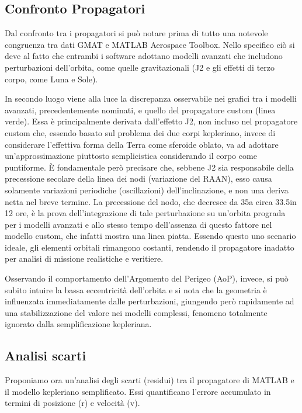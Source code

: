 \documentclass[12pt, a4paper]{article}
\begin{document}
\subsection{Confronto Propagatori}
Dal confronto tra i propagatori si può notare prima di tutto una notevole congruenza tra dati GMAT e MATLAB Aerospace Toolbox. Nello specifico ciò si deve al fatto che entrambi i software adottano modelli avanzati che includono perturbazioni dell'orbita, come quelle gravitazionali (J2 e gli effetti di terzo corpo, come Luna e Sole).

In secondo luogo viene alla luce la discrepanza osservabile nei grafici tra i modelli avanzati, precedentemente nominati, e quello del propagatore custom (linea verde). Essa è principalmente derivata dall'effetto J2, non incluso nel propagatore custom che, essendo basato sul problema dei due corpi kepleriano, invece di considerare l'effettiva forma della Terra come sferoide oblato, va ad adottare un'approssimazione piuttosto semplicistica considerando il corpo come puntiforme. È fondamentale però precisare che, sebbene J2 sia responsabile della precessione secolare della linea dei nodi (variazione del RAAN), esso causa solamente variazioni periodiche (oscillazioni) dell'inclinazione, e non una deriva netta nel breve termine. La precessione del nodo, che decresce da 35\degree a circa 33.5\degree in 12 ore, è la prova dell'integrazione di tale perturbazione su un'orbita prograda per i modelli avanzati e allo stesso tempo dell'assenza di questo fattore nel modello custom, che infatti mostra una linea piatta. Essendo questo uno scenario ideale, gli elementi orbitali rimangono costanti, rendendo il propagatore inadatto per analisi di missione realistiche e veritiere.

Osservando il comportamento dell'Argomento del Perigeo (AoP), invece, si può subito intuire la bassa eccentricità dell’orbita e si nota che la geometria è influenzata immediatamente dalle perturbazioni, giungendo però rapidamente ad una stabilizzazione del valore nei modelli complessi, fenomeno totalmente ignorato dalla semplificazione kepleriana.

\subsection{Analisi scarti}
\label{sec:analisiScarti}
Proponiamo ora un'analisi degli scarti (residui) tra il propagatore di MATLAB e il modello kepleriano semplificato. Essi quantificano l'errore accumulato in termini di posizione (r) e velocità (v).
\end{document}
